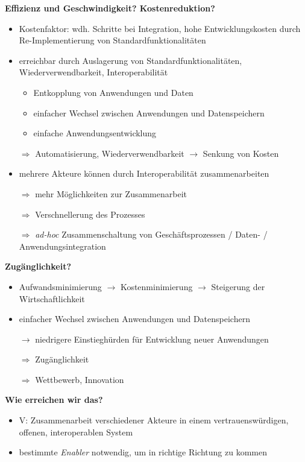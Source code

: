 \textbf{Effizienz und Geschwindigkeit? Kostenreduktion?}
\begin{itemize}
    \item Kostenfaktor: wdh. Schritte bei Integration, hohe Entwicklungskosten durch Re-Implementierung von Standardfunktionalitäten
    \item erreichbar durch Auslagerung von Standardfunktionalitäten, Wiederverwendbarkeit, Interoperabilität
    \begin{itemize}
        \item Entkopplung von Anwendungen und Daten
        \item einfacher Wechsel zwischen Anwendungen und Datenspeichern
        \item einfache Anwendungsentwicklung
    \end{itemize}
    \item[$\Rightarrow$] Automatisierung, Wiederverwendbarkeit $\to$ Senkung von Kosten
    \item mehrere Akteure können durch Interoperabilität zusammenarbeiten
    \item[$\Rightarrow$] mehr Möglichkeiten zur Zusammenarbeit
    \item[$\Rightarrow$] Verschnellerung des Prozesses
    \item[$\Rightarrow$] \emph{ad-hoc} Zusammenschaltung von Geschäftsprozessen / Daten- / Anwendungsintegration
\end{itemize}

\vspace{1em}

\textbf{Zugänglichkeit?}
\begin{itemize}
    \item Aufwandsminimierung $\to$ Kostenminimierung $\to$ Steigerung der Wirtschaftlichkeit
    \item einfacher Wechsel zwischen Anwendungen und Datenspeichern
    \item[$\to$] niedrigere Einstieghürden für Entwicklung neuer Anwendungen
    \item[$\Rightarrow$] Zugänglichkeit
    \item[$\Rightarrow$] Wettbewerb, Innovation
\end{itemize}

\vspace{1em}

\textbf{Wie erreichen wir das?}
\begin{itemize}
    \item V: Zusammenarbeit verschiedener Akteure in einem vertrauenswürdigen, offenen, interoperablen System
    \item bestimmte \emph{Enabler} notwendig, um in richtige Richtung zu kommen
\end{itemize}
